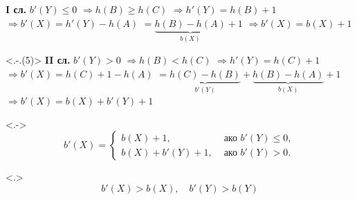 \documentclass[alsotrans]{beamerswitch}
\begin{document}
\begin{frame}[label=rotright]
\begin{overlayarea}{\textwidth}{24ex}
\begin{onlyenv}
      \textbf{I сл. }$b'(Y) \leq 0$
      \onslide<+-> $\Rightarrow h(B) \geq h(C)$
      \onslide<+-> $\Rightarrow h'(Y) = h(B) + 1$
      \onslide<+-> $\Rightarrow b'(X) = h'(Y) - h(A)$
      \onslide<+-> $ = \underbrace{h(B) - h(A)}_{b(X)} + 1$
      \onslide<+-> $\Rightarrow b'(X) = b(X) + 1$
    \end{onlyenv}
    \onslide<+->
    \begin{onlyenv}<.-.(5)>
      \textbf{II сл.} $b'(Y) > 0$
      \onslide<+-> $\Rightarrow h(B) < h(C)$
      \onslide<+-> $\Rightarrow h'(Y) = h(C) + 1$
      \onslide<+-> $\Rightarrow b'(X) = h(C) + 1 - h(A)$
      \onslide<+-> $ = \underbrace{h(C) - h(B)}_{b'(Y)} + \underbrace{h(B) - h(A)}_{b(X)} + 1$
      \onslide<+-> $\Rightarrow b'(X) = b(X) + b'(Y) + 1$
    \end{onlyenv}
    \onslide<+->
    \begin{onlyenv}<.->
      \begin{equation*}
        b'(X) =
        \begin{cases}
          b(X) + 1,&\text{ ако }b'(Y) \leq 0,\\
          b(X) + b'(Y) + 1,&\text{ ако }b'(Y) > 0.
        \end{cases}
      \end{equation*}
    \end{onlyenv}
    \onslide<+->
    \begin{onlyenv}<.>
      \vspace{-2ex}
      \begin{equation*}
        b'(X) > b(X), \quad b'(Y) > b(Y)
      \end{equation*}
    \end{onlyenv}
  \end{overlayarea}
\end{frame}
\end{document}
